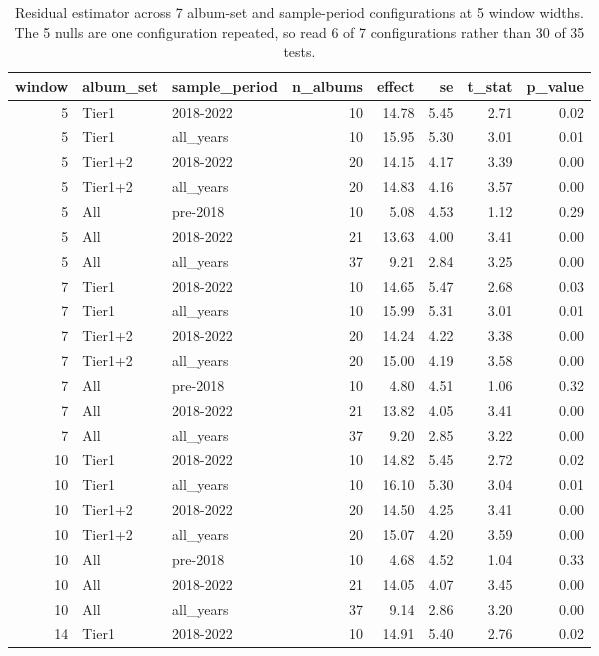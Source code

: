 \begin{table}
\caption{Residual estimator across 7 album-set and sample-period configurations at 5 window widths. The 5 nulls are one configuration repeated, so read 6 of 7 configurations rather than 30 of 35 tests.}
\begin{tabular}{rllrrrrr}
\toprule
window & album\_set & sample\_period & n\_albums & effect & se & t\_stat & p\_value \\
\midrule
5 & Tier1 & 2018-2022 & 10 & 14.78 & 5.45 & 2.71 & 0.02 \\
5 & Tier1 & all\_years & 10 & 15.95 & 5.30 & 3.01 & 0.01 \\
5 & Tier1+2 & 2018-2022 & 20 & 14.15 & 4.17 & 3.39 & 0.00 \\
5 & Tier1+2 & all\_years & 20 & 14.83 & 4.16 & 3.57 & 0.00 \\
5 & All & pre-2018 & 10 & 5.08 & 4.53 & 1.12 & 0.29 \\
5 & All & 2018-2022 & 21 & 13.63 & 4.00 & 3.41 & 0.00 \\
5 & All & all\_years & 37 & 9.21 & 2.84 & 3.25 & 0.00 \\
7 & Tier1 & 2018-2022 & 10 & 14.65 & 5.47 & 2.68 & 0.03 \\
7 & Tier1 & all\_years & 10 & 15.99 & 5.31 & 3.01 & 0.01 \\
7 & Tier1+2 & 2018-2022 & 20 & 14.24 & 4.22 & 3.38 & 0.00 \\
7 & Tier1+2 & all\_years & 20 & 15.00 & 4.19 & 3.58 & 0.00 \\
7 & All & pre-2018 & 10 & 4.80 & 4.51 & 1.06 & 0.32 \\
7 & All & 2018-2022 & 21 & 13.82 & 4.05 & 3.41 & 0.00 \\
7 & All & all\_years & 37 & 9.20 & 2.85 & 3.22 & 0.00 \\
10 & Tier1 & 2018-2022 & 10 & 14.82 & 5.45 & 2.72 & 0.02 \\
10 & Tier1 & all\_years & 10 & 16.10 & 5.30 & 3.04 & 0.01 \\
10 & Tier1+2 & 2018-2022 & 20 & 14.50 & 4.25 & 3.41 & 0.00 \\
10 & Tier1+2 & all\_years & 20 & 15.07 & 4.20 & 3.59 & 0.00 \\
10 & All & pre-2018 & 10 & 4.68 & 4.52 & 1.04 & 0.33 \\
10 & All & 2018-2022 & 21 & 14.05 & 4.07 & 3.45 & 0.00 \\
10 & All & all\_years & 37 & 9.14 & 2.86 & 3.20 & 0.00 \\
14 & Tier1 & 2018-2022 & 10 & 14.91 & 5.40 & 2.76 & 0.02 \\

\end{tabular}
\end{table}
